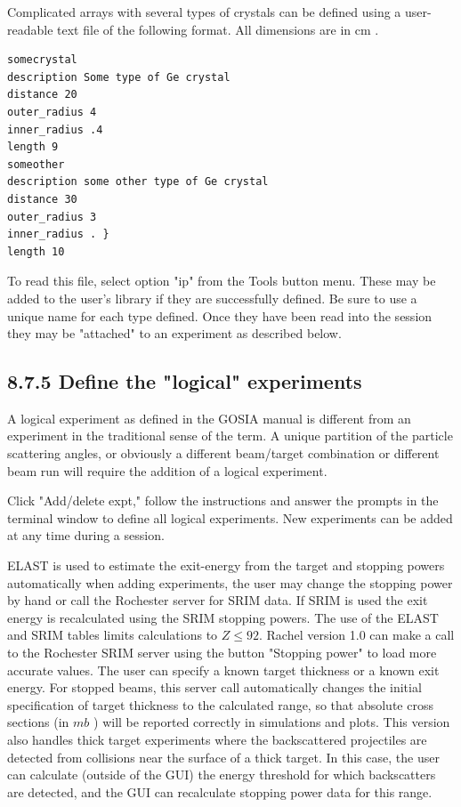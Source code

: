 \documentclass[10pt]{article}
\begin{document}
Complicated arrays with several types of crystals can be defined using a user-readable text file of the following format. All dimensions are in cm .

\begin{verbatim}
somecrystal
description Some type of Ge crystal
distance 20
outer_radius 4
inner_radius .4
length 9
someother
description some other type of Ge crystal
distance 30
outer_radius 3
inner_radius . }
length 10
\end{verbatim}

To read this file, select option "ip" from the Tools button menu. These may be added to the user's library if they are successfully defined. Be sure to use a unique name for each type defined. Once they have been read into the session they may be "attached" to an experiment as described below.

\subsection*{8.7.5 Define the "logical" experiments}
A logical experiment as defined in the GOSIA manual is different from an experiment in the traditional sense of the term. A unique partition of the particle scattering angles, or obviously a different beam/target combination or different beam run will require the addition of a logical experiment.

Click "Add/delete expt," follow the instructions and answer the prompts in the terminal window to define all logical experiments. New experiments can be added at any time during a session.

ELAST is used to estimate the exit-energy from the target and stopping powers automatically when adding experiments, the user may change the stopping power by hand or call the Rochester server for SRIM data. If SRIM is used the exit energy is recalculated using the SRIM stopping powers. The use of the ELAST and SRIM tables limits calculations to $Z \leq 92$. Rachel version 1.0 can make a call to the Rochester SRIM server using the button "Stopping power" to load more accurate values. The user can specify a known target thickness or a known exit energy. For stopped beams, this server call automatically changes the initial specification of target thickness to the calculated range, so that absolute cross sections (in $m b$ ) will be reported correctly in simulations and plots. This version also handles thick target experiments where the backscattered projectiles are detected from collisions near the surface of a thick target. In this case, the user can calculate (outside of the GUI) the energy threshold for which backscatters are detected, and the GUI can recalculate stopping power data for this range.
\end{document}
